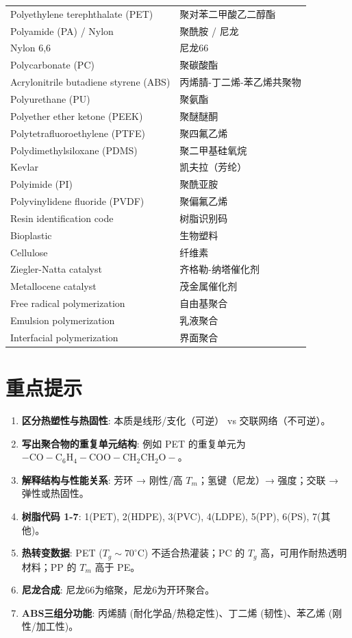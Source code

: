 \documentclass[12pt,a4paper]{ctexart}
\begin{document}
\begin{longtable}{p{10cm}p{5cm}}
Polyethylene terephthalate (PET) & 聚对苯二甲酸乙二醇酯 \\
Polyamide (PA) / Nylon & 聚酰胺 / 尼龙 \\
Nylon 6,6 & 尼龙66 \\
Polycarbonate (PC) & 聚碳酸酯 \\
Acrylonitrile butadiene styrene (ABS) & 丙烯腈-丁二烯-苯乙烯共聚物 \\
Polyurethane (PU) & 聚氨酯 \\
Polyether ether ketone (PEEK) & 聚醚醚酮 \\
Polytetrafluoroethylene (PTFE) & 聚四氟乙烯 \\
Polydimethylsiloxane (PDMS) & 聚二甲基硅氧烷 \\
Kevlar & 凯夫拉（芳纶） \\
Polyimide (PI) & 聚酰亚胺 \\
Polyvinylidene fluoride (PVDF) & 聚偏氟乙烯 \\
Resin identification code & 树脂识别码 \\
Bioplastic & 生物塑料 \\
Cellulose & 纤维素 \\
Ziegler-Natta catalyst & 齐格勒-纳塔催化剂 \\
Metallocene catalyst & 茂金属催化剂 \\
Free radical polymerization & 自由基聚合 \\
Emulsion polymerization & 乳液聚合 \\
Interfacial polymerization & 界面聚合 \\
\bottomrule
\end{longtable}

\newpage
\section*{重点提示}
\begin{enumerate}[leftmargin=*]
    \item \textbf{区分热塑性与热固性}: 本质是线形/支化（可逆） vs 交联网络（不可逆）。
    \item \textbf{写出聚合物的重复单元结构}: 例如 PET 的重复单元为 $-\mathrm{CO}-\mathrm{C_6H_4}-\mathrm{COO}-\mathrm{CH_2CH_2O}-$。
    \item \textbf{解释结构与性能关系}: 芳环 → 刚性/高 $T_m$；氢键（尼龙）→ 强度；交联 → 弹性或热固性。
    \item \textbf{树脂代码 1-7}: 1(PET), 2(HDPE), 3(PVC), 4(LDPE), 5(PP), 6(PS), 7(其他)。
    \item \textbf{热转变数据}:  PET ($T_g\sim70^\circ$C) 不适合热灌装；PC 的 $T_g$ 高，可用作耐热透明材料；PP 的 $T_m$ 高于 PE。
    \item \textbf{尼龙合成}: 尼龙66为缩聚，尼龙6为开环聚合。
    \item \textbf{ABS三组分功能}: 丙烯腈 (耐化学品/热稳定性)、丁二烯 (韧性)、苯乙烯 (刚性/加工性)。
\end{enumerate}
\end{document}
